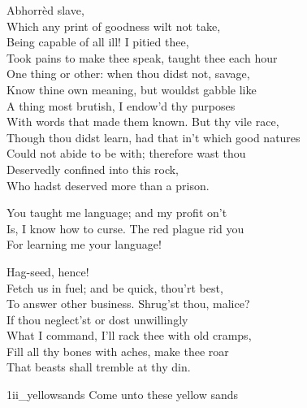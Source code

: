 \begin{verse_speech}[Miranda] 
Abhorrèd slave,\\
Which any print of goodness wilt not take,\\
Being capable of all ill! I pitied thee,\\
Took pains to make thee speak, taught thee each hour\\
One thing or other: when thou didst not, savage,\\
Know thine own meaning, but wouldst gabble like\\
A thing most brutish, I endow'd thy purposes\\
With words that made them known. But thy vile race,\\
Though thou didst learn, had that in't which good natures\\
Could not abide to be with; therefore wast thou\\
Deservedly confined into this rock,\\
Who hadst deserved more than a prison.
\end{verse_speech}



\begin{verse_speech}[Caliban] 
You taught me language; and my profit on't\\
Is, I know how to curse. The red plague rid you\\
For learning me your language!
\end{verse_speech}

\begin{verse_speech}[Prospero] 
Hag-seed, hence!\\
Fetch us in fuel; and be quick, thou'rt best,\\
To answer other business. Shrug'st thou, malice?\\
If thou neglect'st or dost unwillingly\\
What I command, I'll rack thee with old cramps,\\
Fill all thy bones with aches, make thee roar\\
That beasts shall tremble at thy din.
\end{verse_speech}


\begin{pictures} %
	\begin{a4}
		\begin{colorbigpic}
			[1.0]
			{1ii_yellowsands}
			{Come unto these yellow sands}
		\end{colorbigpic}
	\end{a4}
\end{pictures}



